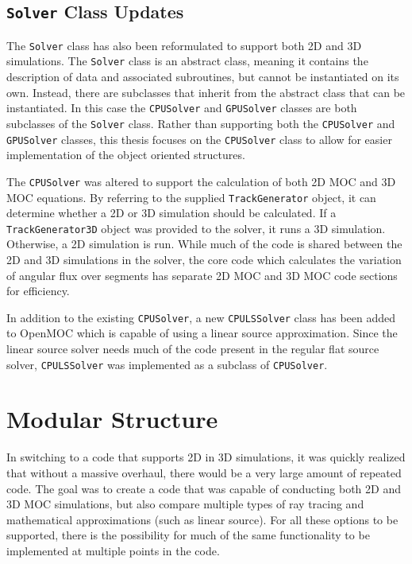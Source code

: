 \subsection{\texttt{Solver} Class Updates}
\label{sec:oo-solver}

The \texttt{Solver} class has also been reformulated to support both 2D and 3D simulations. The \texttt{Solver} class is an abstract class, meaning it contains the description of data and associated subroutines, but cannot be instantiated on its own. Instead, there are subclasses that inherit from the abstract class that can be instantiated. In this case the \texttt{CPUSolver} and \texttt{GPUSolver} classes are both subclasses of the \texttt{Solver} class. Rather than supporting both the \texttt{CPUSolver} and \texttt{GPUSolver} classes, this thesis focuses on the \texttt{CPUSolver} class to allow for easier implementation of the object oriented structures.

The \texttt{CPUSolver} was altered to support the calculation of both 2D MOC and 3D MOC equations. By referring to the supplied \texttt{TrackGenerator} object, it can determine whether a 2D or 3D simulation should be calculated. If a \texttt{TrackGenerator3D} object was provided to the solver, it runs a 3D simulation. Otherwise, a 2D simulation is run. While much of the code is shared between the 2D and 3D simulations in the solver, the core code which calculates the variation of angular flux over segments has separate 2D MOC and 3D MOC code sections for efficiency.

In addition to the existing \texttt{CPUSolver}, a new \texttt{CPULSSolver} class has been added to OpenMOC which is capable of using a linear source approximation. Since the linear source solver needs much of the code present in the regular flat source solver, \texttt{CPULSSolver} was implemented as a subclass of \texttt{CPUSolver}.

\section{Modular Structure}
\label{sec:modular-structure}

In switching to a code that supports 2D in 3D simulations, it was quickly realized that without a massive overhaul, there would be a very large amount of repeated code. The goal was to create a code that was capable of conducting both 2D and 3D MOC simulations, but also compare multiple types of ray tracing and mathematical approximations (such as linear source). For all these options to be supported, there is the possibility for much of the same functionality to be implemented at multiple points in the code.

